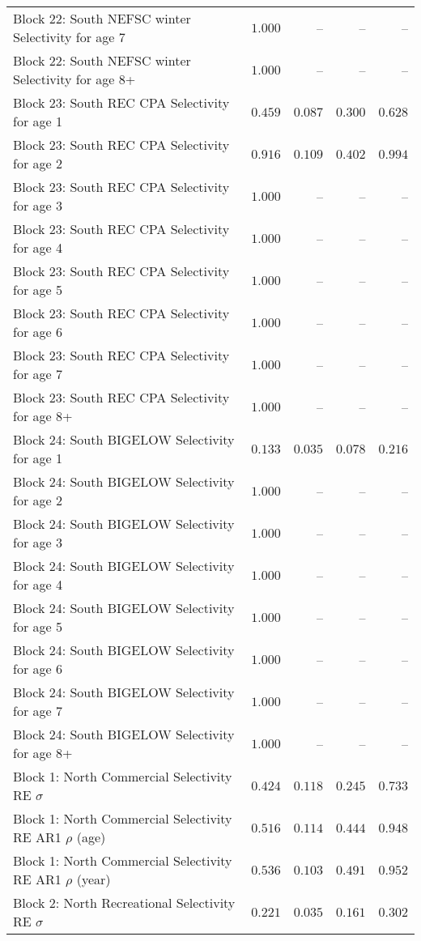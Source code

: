 \documentclass[
]{article}
\begin{document}
\begin{landscape}
\begin{longtable}[t]{lrrrr}
Block 22: South NEFSC winter Selectivity for age 7 & $1.000$ & -- & -- & --\\
Block 22: South NEFSC winter Selectivity for age 8+ & $1.000$ & -- & -- & --\\
Block 23: South REC CPA Selectivity for age 1 & $0.459$ & $0.087$ & $0.300$ & $0.628$\\
Block 23: South REC CPA Selectivity for age 2 & $0.916$ & $0.109$ & $0.402$ & $0.994$\\
\addlinespace
Block 23: South REC CPA Selectivity for age 3 & $1.000$ & -- & -- & --\\
Block 23: South REC CPA Selectivity for age 4 & $1.000$ & -- & -- & --\\
Block 23: South REC CPA Selectivity for age 5 & $1.000$ & -- & -- & --\\
Block 23: South REC CPA Selectivity for age 6 & $1.000$ & -- & -- & --\\
Block 23: South REC CPA Selectivity for age 7 & $1.000$ & -- & -- & --\\
\addlinespace
Block 23: South REC CPA Selectivity for age 8+ & $1.000$ & -- & -- & --\\
Block 24: South BIGELOW Selectivity for age 1 & $0.133$ & $0.035$ & $0.078$ & $0.216$\\
Block 24: South BIGELOW Selectivity for age 2 & $1.000$ & -- & -- & --\\
Block 24: South BIGELOW Selectivity for age 3 & $1.000$ & -- & -- & --\\
Block 24: South BIGELOW Selectivity for age 4 & $1.000$ & -- & -- & --\\
\addlinespace
Block 24: South BIGELOW Selectivity for age 5 & $1.000$ & -- & -- & --\\
Block 24: South BIGELOW Selectivity for age 6 & $1.000$ & -- & -- & --\\
Block 24: South BIGELOW Selectivity for age 7 & $1.000$ & -- & -- & --\\
Block 24: South BIGELOW Selectivity for age 8+ & $1.000$ & -- & -- & --\\
Block 1: North Commercial Selectivity RE $\sigma$ & $0.424$ & $0.118$ & $0.245$ & $0.733$\\
\addlinespace
Block 1: North Commercial Selectivity RE AR1 $\rho$ (age) & $0.516$ & $0.114$ & $0.444$ & $0.948$\\
Block 1: North Commercial Selectivity RE AR1 $\rho$ (year) & $0.536$ & $0.103$ & $0.491$ & $0.952$\\
Block 2: North Recreational Selectivity RE $\sigma$ & $0.221$ & $0.035$ & $0.161$ & $0.302$\\

\end{longtable}
\end{landscape}
\end{document}
